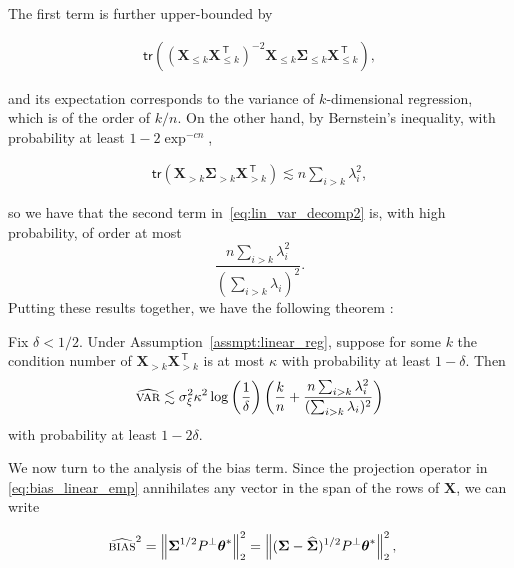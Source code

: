 The first term is further upper-bounded by

\begin{align}
	\mathsf{tr}\left(({\boldsymbol X}_{\leq k}{\boldsymbol X}_{\leq k}^\ensuremath{{\scriptscriptstyle\mathsf{\,T}}})^{-2} {\boldsymbol X}_{\leq k} {\boldsymbol \Sigma}_{\leq k} {\boldsymbol X}^\ensuremath{{\scriptscriptstyle\mathsf{\,T}}}_{\leq k} \right),
\end{align}

and its expectation corresponds to the variance of $k$-dimensional regression, which is of the order of $k/n$. On the other hand, by Bernstein's inequality, with probability at least $1-2\exp^{-cn}$,

\begin{align}
	\mathsf{tr}({\boldsymbol X}_{> k} {\boldsymbol \Sigma}_{> k} {\boldsymbol X}^\ensuremath{{\scriptscriptstyle\mathsf{\,T}}}_{> k}) \lesssim n\sum_{i>k}
    \lambda_i^2,
\end{align}

so we have that the second term in~\eqref{eq:lin_var_decomp2} is, with high probability, of order at most
$$\frac{n\sum_{i>k} \lambda_i^2}{(\sum_{i>k} \lambda_i)^2}.$$
Putting these results together, we have the following theorem \cite{tsigler2020benign}:

\begin{theorem}
	\label{thm:var_linear}
    Fix $\delta<1/2$.
    Under Assumption~\ref{assmpt:linear_reg}, 
	suppose for some $k$ the condition number of ${\boldsymbol X}_{> k}{\boldsymbol X}_{>
    k}^\ensuremath{{\scriptscriptstyle\mathsf{\,T}}}$ is at most $\kappa$ with probability at least $1-\delta$.
    Then
	\begin{align}
		\label{eq:var_linear_condition}
		{\widehat{\textsc{var}}} \lesssim \sigma^2_\xi \kappa^2
        \log\left(\frac{1}{\delta}\right) 
        \left( \frac{k}{n} + \frac{ n \sum_{i>k} \lambda_i^2}{(\sum_{i>k} \lambda_i)^2}\right) 
	\end{align}	
	with probability at least $1-2\delta$.
\end{theorem}

We now turn to the analysis of the bias term. Since the projection operator in \eqref{eq:bias_linear_emp} annihilates any vector in the span of the rows of ${\boldsymbol X}$, we can write

\begin{align}
	\label{eq:simple_bias_calc}
	{\widehat{\textsc{bias}}^2} = \left\|{\boldsymbol \Sigma}^{1/2} P^\perp  {\boldsymbol \theta}^*\right\|^2_2 
	&= \left\|({\boldsymbol \Sigma} - \widehat{{\boldsymbol \Sigma}})^{1/2}P^\perp  {\boldsymbol \theta}^*\right\|^2_2,
\end{align}

